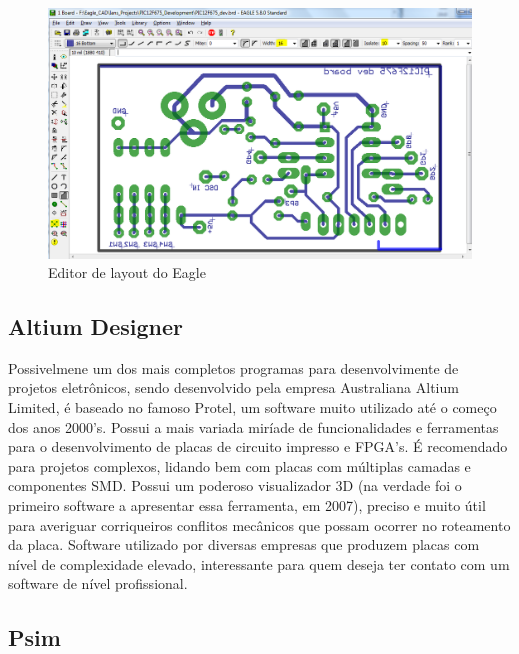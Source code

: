 \begin{figure}[htb]
\center
\includegraphics[width=1\textwidth]{./include/chapters/sections/hard/section1/img/Eagle_layout.png}
\caption{Editor de layout do Eagle}
\label{Eagle_layout}
\end{figure}

\subsection{Altium Designer}
Possivelmene um dos mais completos programas para desenvolvimente de projetos eletr\^onicos, sendo desenvolvido pela empresa Australiana Altium Limited, \'e baseado  no famoso Protel, um software muito utilizado at\'e o começo dos anos 2000's. Possui a mais variada mir\'iade de funcionalidades e ferramentas para o desenvolvimento de placas de circuito impresso e FPGA's. \'E recomendado para projetos complexos, lidando bem com placas com m\'ultiplas camadas e componentes SMD. Possui um poderoso visualizador 3D (na verdade foi o primeiro software a apresentar essa ferramenta, em 2007), preciso e muito \'util para averiguar corriqueiros conflitos mec\^anicos que possam ocorrer no roteamento da placa. Software utilizado por diversas empresas que produzem placas com n\'ivel de complexidade elevado, interessante para quem deseja ter contato com um software de n\'ivel profissional.

\subsection{Psim}
